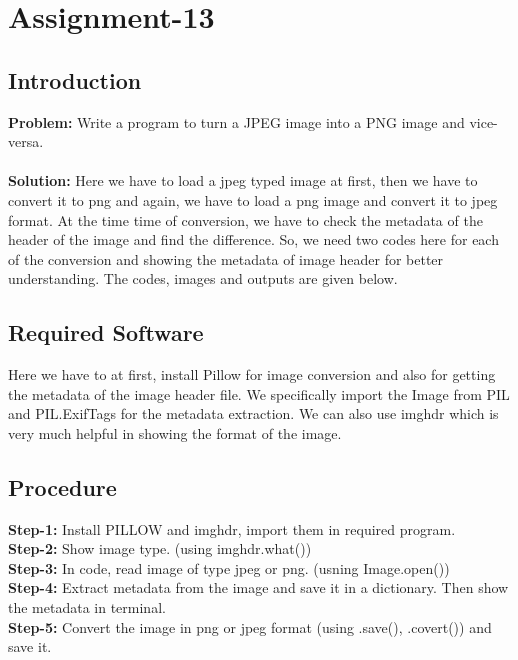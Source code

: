 \documentclass{article}
\begin{document}
{
    \section{Assignment-13}
    \subsection{Introduction}
    \textbf {Problem: }
    Write a program to turn a JPEG image into a PNG image and vice-versa.\\
    \\
    \textbf{Solution: }
    Here we have to load a jpeg typed image at first, then we have to convert it to png and again, we have to load a png image and convert it to jpeg format. At the time time of conversion, we have to check the metadata of the header of the image and find the difference. So, we need two codes here for each of the conversion and showing the metadata of image header for better understanding. The codes, images and outputs are given below.\\
    
    \subsection{Required Software}
    Here we have to at first, install Pillow for image conversion and also for getting the metadata of the image header file. We specifically import the Image from PIL and PIL.ExifTags for the metadata extraction. We can also use imghdr which is very much helpful in showing the format of the image.\\
 
    \subsection{Procedure}
    \textbf{Step-1:}
    Install PILLOW and imghdr, import them in required program.\\
    \textbf{Step-2:}
    Show image type. (using imghdr.what()) \\
    \textbf{Step-3:}
    In code, read image of type jpeg or png. (usning Image.open())\\
    \textbf{Step-4:}
    Extract metadata from the image and save it in a dictionary. Then show the metadata in terminal. \\
    \textbf{Step-5:}
    Convert the image in png or jpeg format (using .save(), .covert()) and save it. \\  
    
}
\end{document}
